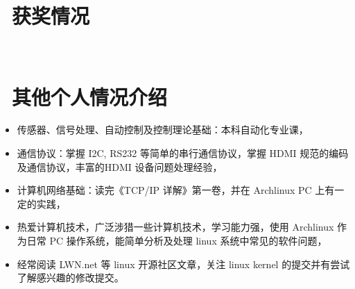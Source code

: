 \documentclass{resume}
\begin{document}
~\\
\section{\faHeartO\ 获奖情况}

~\\
\section{\faInfo\ 其他个人情况介绍}
\begin{itemize}[parsep=0.5ex]
  \item 传感器、信号处理、自动控制及控制理论基础：本科自动化专业课，
  \item 通信协议：掌握 I2C, RS232 等简单的串行通信协议，掌握 HDMI 规范的编码及通信协议，丰富的HDMI 设备问题处理经验，
  \item 计算机网络基础：读完《TCP/IP 详解》第一卷，并在 Archlinux PC 上有一定的实践，
  \item 热爱计算机技术，广泛涉猎一些计算机技术，学习能力强，使用 Archlinux 作为日常 PC 操作系统，能简单分析及处理 linux 系统中常见的软件问题，
  \item 经常阅读 LWN.net 等 linux 开源社区文章，关注 linux kernel 的提交并有尝试了解感兴趣的修改提交。
\end{itemize}

%
%
\end{document}

